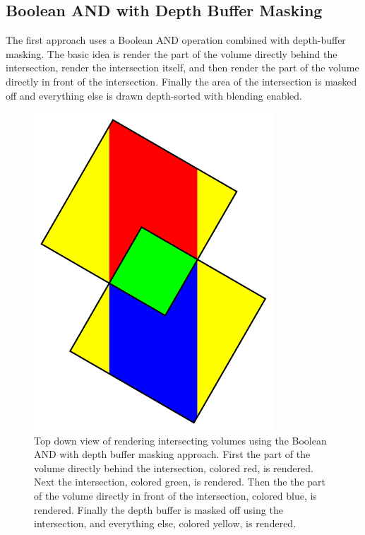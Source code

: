 \documentclass{article}
\begin{document}
\subsection{Boolean AND with Depth Buffer Masking}

The first approach uses a Boolean AND operation combined with depth-buffer
masking.  The basic idea is render the part of the volume directly behind the
intersection, render the intersection itself, and then render the part of the
volume directly in front of the intersection.  Finally the area of the
intersection is masked off and everything else is drawn depth-sorted with
blending enabled.

\begin{figure}
\centering
\includegraphics[width=0.8\textwidth]{boolean-and.pdf}
\caption{
Top down view of rendering intersecting volumes using the Boolean AND with depth
buffer masking approach.  First the part of the volume directly behind the
intersection, colored red, is rendered.  Next the intersection, colored green,
is rendered.  Then the the part of the volume directly in front of the
intersection, colored blue, is rendered.  Finally the depth buffer is masked off
using the intersection, and everything else, colored yellow, is rendered.
}
\label{boolean-and}
\end{figure}
\end{document}
